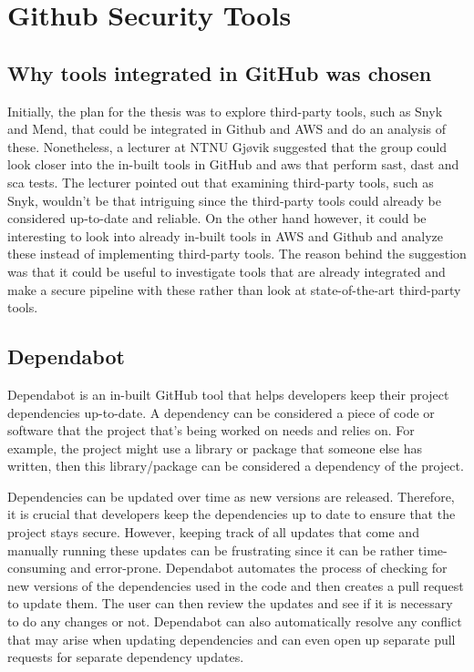 \section{Github Security Tools}
\subsection{Why tools integrated in GitHub was chosen}
Initially, the plan for the thesis  was to explore third-party tools, such as Snyk and Mend,  that could be integrated in Github and AWS and do an analysis of these. Nonetheless, a lecturer at NTNU Gjøvik suggested that the group could look closer into the in-built tools in GitHub and aws that perform \acrshort{sast}, \acrshort{dast} and \acrshort{sca} tests. The lecturer pointed out that examining third-party tools, such as Snyk, wouldn't be that intriguing since the third-party tools could already be considered up-to-date and reliable. On the other hand however, it could be interesting  to look into already in-built tools in AWS and Github and analyze these instead of implementing third-party tools. The reason behind the suggestion was that it could be useful to investigate tools that are already integrated and make a secure pipeline with these rather than look at state-of-the-art third-party tools. 

\subsection{Dependabot}
Dependabot is an in-built GitHub tool that helps developers keep their project dependencies up-to-date. A dependency can be considered a piece of code or software that the project that's being worked on needs and relies on. For example, the project might use a library or package that someone else has written, then this library/package can be considered a dependency of the project. 

Dependencies can be updated over time as new versions are released. Therefore, it is crucial that developers keep the dependencies up to date to ensure that the project stays secure. However, keeping track of all updates that come and manually running these updates can be frustrating since it can be rather time-consuming and error-prone. Dependabot automates the process of checking for new versions of the dependencies used in the code and then creates a pull request to update them. The user can then review the updates and see if it is necessary to do any changes or not. 
Dependabot can also automatically resolve any conflict that may arise when updating dependencies and can even open up separate pull requests for separate dependency updates.  \cite{GithubDependabot2}

